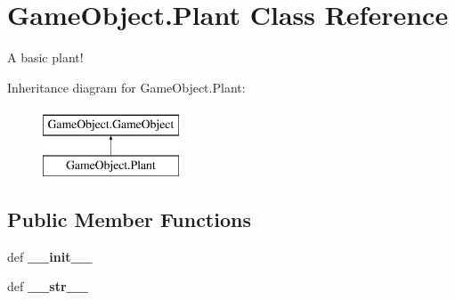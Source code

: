 \hypertarget{classGameObject_1_1Plant}{\section{\-Game\-Object.\-Plant \-Class \-Reference}
\label{classGameObject_1_1Plant}
}


\-A basic plant!  


\-Inheritance diagram for \-Game\-Object.\-Plant\-:\begin{figure}[H]
\begin{center}
\leavevmode
\includegraphics[height=2.000000cm]{classGameObject_1_1Plant}
\end{center}
\end{figure}
\subsection*{\-Public \-Member \-Functions}
\begin{DoxyCompactItemize}
\item 
\hypertarget{classGameObject_1_1Plant_adc0bf6d0866889f11dc6c0676b1546b7}{def {\bfseries \-\_\-\-\_\-init\-\_\-\-\_\-}}\label{classGameObject_1_1Plant_adc0bf6d0866889f11dc6c0676b1546b7}

\item 
\hypertarget{classGameObject_1_1Plant_ae55d04ce36ba564ae156caf54b187cc9}{def {\bfseries \-\_\-\-\_\-str\-\_\-\-\_\-}}\label{classGameObject_1_1Plant_ae55d04ce36ba564ae156caf54b187cc9}

\end{DoxyCompactItemize}
